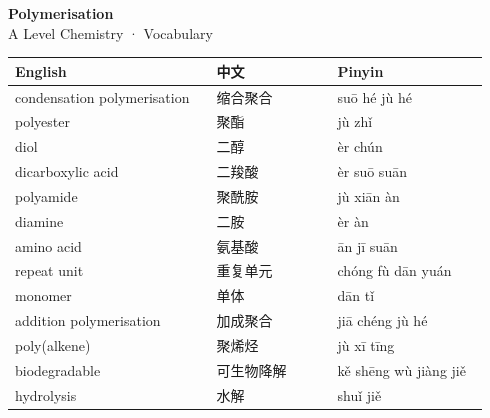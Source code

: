 \documentclass[11pt]{article}
\begin{document}
\begin{center}
  {\LARGE\bfseries Polymerisation}\\[0.35em]
  {\large A Level Chemistry · Vocabulary}
\end{center}
\vspace{0.6em}

\begin{longtable}{@{}p{0.40\linewidth}p{0.24\linewidth}p{0.30\linewidth}@{}}
\toprule
\textbf{English} & \textbf{中文} & \textbf{Pinyin} \\
\midrule
\endhead
\bottomrule
\endlastfoot
condensation polymerisation & 缩合聚合 & suō hé jù hé \\
polyester & 聚酯 & jù zhǐ \\
diol & 二醇 & èr chún \\
dicarboxylic acid & 二羧酸 & èr suō suān \\
polyamide & 聚酰胺 & jù xiān àn \\
diamine & 二胺 & èr àn \\
amino acid & 氨基酸 & ān jī suān \\
repeat unit & 重复单元 & chóng fù dān yuán \\
monomer & 单体 & dān tǐ \\
addition polymerisation & 加成聚合 & jiā chéng jù hé \\
poly(alkene) & 聚烯烃 & jù xī tīng \\
biodegradable & 可生物降解 & kě shēng wù jiàng jiě \\
hydrolysis & 水解 & shuǐ jiě \\
\end{longtable}
\end{document}
